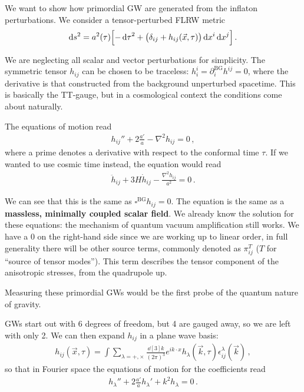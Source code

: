 \documentclass[main.tex]{subfiles}
\begin{document}
We want to show how primordial GW are generated from the inflaton perturbations.
We consider a tensor-perturbed FLRW metric 
%
\begin{align}
\dd{s^2} = a^2 (\tau )
\qty[- \dd{\tau}^2 + \qty(\delta_{ij} + h_{ij} (\vec{x}, \tau )) \dd{x^{i}} \dd{x^{j}}]
\,.
\end{align}

We are neglecting all scalar and vector perturbations for simplicity. 
The symmetric tensor \(h_{ij}\) can be chosen to be traceless: \(h^{i}_{i} = \partial_{i}^{\text{BG}} h^{ij} = 0 \), where the derivative is that constructed from the background unperturbed spacetime. 
This is basically the TT-gauge, but in a cosmological context the conditions come about naturally. 

The equations of motion read 
%
\begin{align}
h_{ij}'' + 2 \frac{a'}{a} - \nabla^2 h_{ij} = 0
\,,
\end{align}
%
where a prime denotes a derivative with respect to the conformal time \(\tau \).
If we wanted to use cosmic time instead, the equation would read 
%
\begin{align}
\ddot{h}_{ij} + 3 H \dot{h}_{ij} - \frac{\nabla^2 h_{ij}}{a^2} = 0
\,.
\end{align}

We can see that this is the same as \(\square^{\text{BG}} h_{ij} = 0\). The equation is the same as a \textbf{massless, minimally coupled scalar field}. 
We already know the solution for these equations: the mechanism of quantum vacuum amplification still works. 
We have a 0 on the right-hand side since we are working up to linear order, in full generality there will be other source terms, commonly denoted as \(\pi^{T}_{ij}\) (\(T\) for ``source of tensor modes''). 
This term describes the tensor component of the anisotropic stresses, from the quadrupole up.

Measuring these primordial GWs would be the first probe of the quantum nature of gravity.

GWs start out with 6 degrees of freedom, but 4 are gauged away, so we are left with only 2. 
We can then expand \(h_{ij}\) in a plane wave basis: 
%
\begin{align}
h_{ij} (\vec{x}, \tau )
= \int  \sum_{\lambda = +, \times }
\frac{ \dd[3]{k}}{(2 \pi )^3}
e^{i k \cdot x}
h_\lambda (\vec{k}, \tau ) \epsilon^\lambda_{ij} (\vec{k})
\,,
\end{align}
%
so that in Fourier space the equations of motion for the coefficients read
%
\begin{align}
h_\lambda'' + 2 \frac{a'}{a} h_\lambda' + k^2 h_\lambda = 0
\,.
\end{align}
\end{document}
